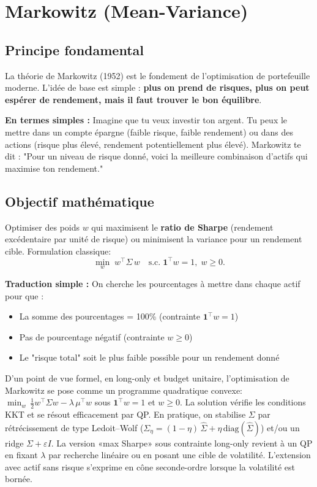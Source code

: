 \documentclass[11pt,a4paper]{article}
\begin{document}
\section{Markowitz (Mean-Variance)}

\subsection{Principe fondamental}
La théorie de Markowitz (1952) est le fondement de l'optimisation de portefeuille moderne. L'idée de base est simple : \textbf{plus on prend de risques, plus on peut espérer de rendement, mais il faut trouver le bon équilibre}.

\textbf{En termes simples :} Imagine que tu veux investir ton argent. Tu peux le mettre dans un compte épargne (faible risque, faible rendement) ou dans des actions (risque plus élevé, rendement potentiellement plus élevé). Markowitz te dit : "Pour un niveau de risque donné, voici la meilleure combinaison d'actifs qui maximise ton rendement."

\subsection{Objectif mathématique}
Optimiser des poids \(w\) qui maximisent le \textbf{ratio de Sharpe} (rendement excédentaire par unité de risque) ou minimisent la variance pour un rendement cible. Formulation classique:
 \[\min_{w} \; w^\top \Sigma \, w \quad \text{s.c.} \; \mathbf{1}^\top w = 1,\; w \ge 0.\]

\textbf{Traduction simple :} On cherche les pourcentages à mettre dans chaque actif pour que :
\begin{itemize}
\item La somme des pourcentages = 100\% (contrainte \(\mathbf{1}^\top w = 1\))
\item Pas de pourcentage négatif (contrainte \(w \ge 0\))
\item Le "risque total" soit le plus faible possible pour un rendement donné
\end{itemize}
\noindent D'un point de vue formel, en long-only et budget unitaire, l'optimisation de Markowitz se pose comme un programme quadratique convexe: \(\min_w\, \frac{1}{2} w^\top \Sigma w - \lambda \, \mu^\top w\) sous \(\mathbf{1}^\top w=1\) et \(w\ge 0\). La solution vérifie les conditions KKT et se résout efficacement par QP. En pratique, on stabilise \(\Sigma\) par rétrécissement de type Ledoit–Wolf (\(\Sigma_\eta=(1-\eta)\,\hat\Sigma + \eta \, \text{diag}(\hat\Sigma)\)) et/ou un ridge \(\Sigma+\varepsilon I\). La version «max Sharpe» sous contrainte long-only revient à un QP en fixant \(\lambda\) par recherche linéaire ou en posant une cible de volatilité. L'extension avec actif sans risque s'exprime en cône seconde-ordre lorsque la volatilité est bornée.
\end{document}
